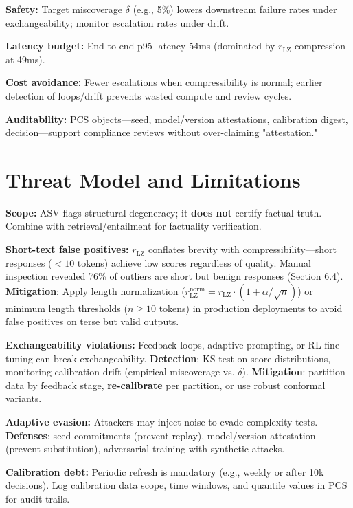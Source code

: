 \documentclass[11pt]{article}
\begin{document}
\textbf{Safety:} Target miscoverage $\delta$ (e.g., 5\%) lowers downstream failure rates under exchangeability; monitor escalation rates under drift.

\textbf{Latency budget:} End-to-end p95 latency 54ms (dominated by $r_{\text{LZ}}$ compression at 49ms).

\textbf{Cost avoidance:} Fewer escalations when compressibility is normal; earlier detection of loops/drift prevents wasted compute and review cycles.

\textbf{Auditability:} PCS objects---seed, model/version attestations, calibration digest, decision---support compliance reviews without over-claiming "attestation."

\section{Threat Model and Limitations}
\label{sec:limitations}

\textbf{Scope:} ASV flags structural degeneracy; it \textbf{does not} certify factual truth. Combine with retrieval/entailment for factuality verification.

\textbf{Short-text false positives:} $r_{\text{LZ}}$ conflates brevity with compressibility---short responses ($< 10$ tokens) achieve low scores regardless of quality. Manual inspection revealed 76\% of outliers are short but benign responses (Section 6.4). \textbf{Mitigation}: Apply length normalization ($r_{\text{LZ}}^{\text{norm}} = r_{\text{LZ}} \cdot (1 + \alpha/\sqrt{n})$) or minimum length thresholds ($n \geq 10$ tokens) in production deployments to avoid false positives on terse but valid outputs.

\textbf{Exchangeability violations:} Feedback loops, adaptive prompting, or RL fine-tuning can break exchangeability. \textbf{Detection}: KS test on score distributions, monitoring calibration drift (empirical miscoverage vs. $\delta$). \textbf{Mitigation}: partition data by feedback stage, \textbf{re-calibrate} per partition, or use robust conformal variants.

\textbf{Adaptive evasion:} Attackers may inject noise to evade complexity tests. \textbf{Defenses}: seed commitments (prevent replay), model/version attestation (prevent substitution), adversarial training with synthetic attacks.

\textbf{Calibration debt:} Periodic refresh is mandatory (e.g., weekly or after 10k decisions). Log calibration data scope, time windows, and quantile values in PCS for audit trails.
\end{document}
